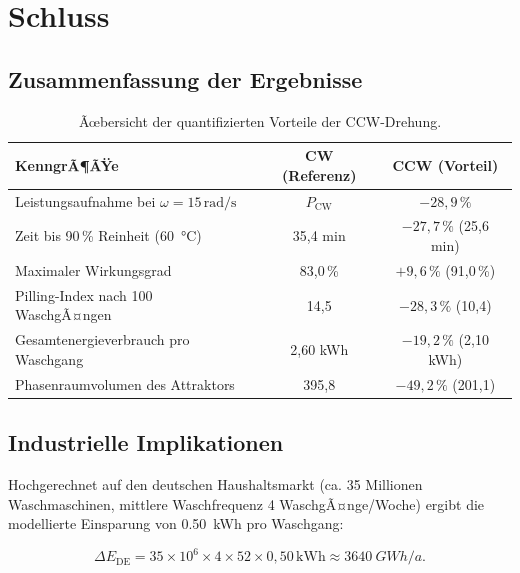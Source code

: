 ﻿\documentclass[12pt,a4paper]{article}
\theoremstyle{remark}
\newcommand{\CW}{\mathrm{CW}}
\begin{document}
	\section{Schluss}
	\label{sec:fin}
	
	\subsection{Zusammenfassung der Ergebnisse}
	
	\begin{table}[H]
		\centering
		\caption{Ãœbersicht der quantifizierten Vorteile der CCW-Drehung.}
		\label{tab:zusammenfassung}
		\begin{tabular}{lcc}
			\toprule
			KenngrÃ¶ÃŸe & CW (Referenz) & CCW (Vorteil) \\
			\midrule
			Leistungsaufnahme bei $\omega = 15\,\mathrm{rad/s}$ & $P_{\CW}$  & $-28{,}9\,\%$ \\
			Zeit bis 90\,\% Reinheit (\SI{60}{\celsius}) & 35{,}4 min & $-27{,}7\,\%$ (25{,}6 min)\\
			Maximaler Wirkungsgrad                        & 83{,}0\,\% & $+9{,}6\,\%$ (91{,}0\,\%) \\
			Pilling-Index nach 100 WaschgÃ¤ngen            & 14{,}5     & $-28{,}3\,\%$ (10{,}4) \\
			Gesamtenergieverbrauch pro Waschgang          & 2{,}60 kWh & $-19{,}2\,\%$ (2{,}10 kWh) \\
			Phasenraumvolumen des Attraktors              & 395{,}8    & $-49{,}2\,\%$ (201{,}1) \\
			\bottomrule
		\end{tabular}
	\end{table}
	
	\subsection{Industrielle Implikationen}
	
	Hochgerechnet auf den deutschen Haushaltsmarkt (ca. 35 Millionen Waschmaschinen,
	mittlere Waschfrequenz 4 WaschgÃ¤nge/Woche) ergibt die modellierte Einsparung
	von \SI{0,50}{kWh} pro Waschgang:
	
	\begin{equation}
		\Delta E_{\mathrm{DE}} = 35 \times 10^6 \times 4 \times 52 \times 0{,}50\,\mathrm{kWh}
		\approx \SI{3640}{GWh/a}.
	\end{equation}
	
\end{document}
